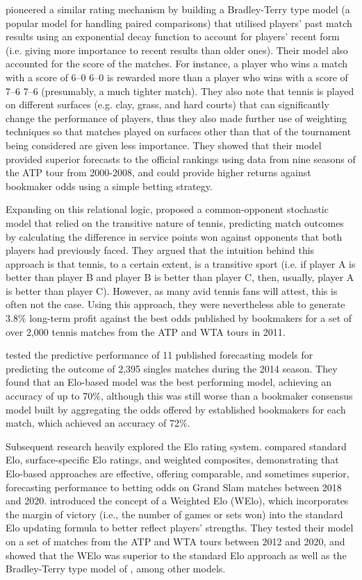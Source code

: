 \textcite{mchale_2011} pioneered a similar rating mechanism by building a Bradley-Terry type model
(a popular model for handling paired comparisons) that utilised players' past match results using an
exponential decay function to account for players' recent form (i.e. giving more importance to
recent results than older ones). Their model also accounted for the score of the matches. For
instance, a player who wins a match with a score of 6--0 6--0 is rewarded more than a player who wins
with a score of 7--6 7--6 (presumably, a much tighter match). They also note that tennis is played on
different surfaces (e.g. clay, grass, and hard courts) that can significantly change the performance
of players, thus they also made further use of weighting techniques so that matches played on
surfaces other than that of the tournament being considered are given less importance. They showed
that their model provided superior forecasts to the official rankings using data from nine seasons
of the ATP tour from 2000-2008, and could provide higher returns against bookmaker odds using a
simple betting strategy.

Expanding on this relational logic, \textcite{knottenbelt_2012} proposed a common-opponent
stochastic model that relied on the transitive nature of tennis, predicting match outcomes by
calculating the difference in service points won against opponents that both players had previously
faced. They argued that the intuition behind this approach is that tennis, to a certain extent, is
a transitive sport (i.e. if player A is better than player B and player B is better than player C,
then, usually, player A is better than player C). However, as many avid tennis fans will attest,
this is often not the case. Using this approach, they were nevertheless able to generate 3.8\%
long-term profit against the best odds published by bookmakers for a set of over 2,000 tennis
matches from the ATP and WTA tours in 2011.

\textcite{kovalchik_2016} tested the predictive performance of 11 published forecasting models for
predicting the outcome of 2,395 singles matches during the 2014 season. They found that an
Elo-based model was the best performing model, achieving an accuracy of up to 70\%, although this
was still worse than a bookmaker consensus model built by aggregating the odds offered by
established bookmakers for each match, which achieved an accuracy of 72\%.

Subsequent research heavily explored the Elo rating system. \textcite{williams_2021} compared
standard Elo, surface-specific Elo ratings, and weighted composites,
demonstrating that Elo-based approaches are effective, offering comparable, and sometimes superior,
forecasting performance to betting odds on Grand Slam matches between 2018 and 2020.
\textcite{angelini_2022} introduced the concept of a Weighted Elo (WElo), which incorporates the
margin of victory (i.e., the number of games or sets won) into the standard Elo updating formula to
better reflect players' strengths. They tested their model on a set of matches from the ATP and WTA
tours between 2012 and 2020, and showed that the WElo was superior to the standard Elo approach
as well as the Bradley-Terry type model of \textcite{mchale_2011}, among other models.

